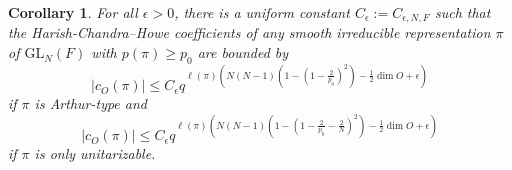 \documentclass{amsart}
\newcommand{\lf}{\left}
\newcommand{\ri}{\right}
\newcommand{\f}{\frac}
\newcommand{\mc}[1]{\mathcal{#1}}
\newcommand{\GL}{\mathrm{GL}}
\newcommand{\eps}{\epsilon}
\newcommand{\1}{\m 1}
\newtheorem{cor}[thm]{Corollary}
\theoremstyle{remark}
\theoremstyle{definition}
\numberwithin{equation}{subsection}
\begin{document}
\begin{cor}
For all $\eps > 0$, there is a uniform constant $C_\eps := C_{\eps, N, F}$ such that the Harish-Chandra--Howe coefficients of any smooth irreducible representation $\pi$ of $\GL_N(F)$ with $p(\pi) \geq p_0$ 
 are bounded by
\[
|c_O(\pi)| \leq C_\eps q^{\ell(\pi) \lf(N(N-1)\lf(1 -  \lf( 1 - \f 2{p_0}\ri)^2\ri) - \f12 \dim O + \eps \ri) } 
\]
if $\pi$ is Arthur-type and
\[
|c_O(\pi)| \leq C_\eps q^{\ell(\pi) \lf(N(N-1)\lf(1 -  \lf( 1 - \f 2{p_0} - \f2N\ri)^2\ri) - \f12 \dim O + \eps \ri) } 
\]
if $\pi$ is only unitarizable.
\end{cor}








 
\end{document}
